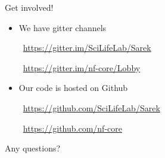 \documentclass{beamer}
\begin{document}
\begin{frame}{Get involved!}
	\begin{itemize}
		\item We have gitter channels

		\faGroup\ \url{https://gitter.im/SciLifeLab/Sarek}

		\faGroup\ \url{https://gitter.im/nf-core/Lobby}
		\pause
	\end{itemize}
	\begin{itemize}
		\item Our code is hosted on Github

		\faGithub\ \url{https://github.com/SciLifeLab/Sarek}

		\faGithub\ \url{https://github.com/nf-core}
	\end{itemize}
\end{frame}

{
	\begin{frame}{Any questions?}
	\end{frame}
}
\end{document}

